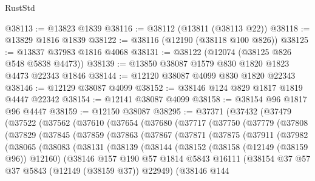 \begin{lexlean}{RustStd}
\begin{coremodule}
@38113 := @13823 @1839
@38116 := @38112 (@13811 (@38113 @22))
@38118 := @13829 @1816 @1839
@38122 := @38116 (@12190 (@38118 @100 @826))
@38125 := @13837 @37983 @1816 @4068
@38131 := @38122 (@12074 (@38125 @826 @548 @5838 @4473))
@38139 := @13850 @38087 @1579 @830 @1820 @1823 @4473 @22343 @1846
@38144 := @12120 @38087 @4099 @830 @1820 @22343
@38146 := @12129 @38087 @4099
@38152 := @38146 @124 @829 @1817 @1819 @4447 @22342
@38154 := @12141 @38087 @4099
@38158 := @38154 @96 @1817 @96 @4447
@38159 := @12150 @38087
@38295 := @37371
    (@37432
      (@37479
        (@37522
          (@37562
            (@37610
              (@37654
                (@37680
                  (@37717
                    (@37750
                      (@37779
                        (@37808
                          (@37829
                            (@37845
                              (@37859
                                (@37863
                                  (@37867
                                    (@37871
                                      (@37875
                                        (@37911
                                          (@37982
                                            (@38065
                                              (@38083
                                                (@38131
                                                  (@38139
                                                    (@38144
                                                      (@38152
                                                        (@38158 (@12149 (@38159 @96)) @12160)
                                                        (@38146
                                                          @157
                                                          @190
                                                          @57
                                                          @1814
                                                          @5843
                                                          @16111
                                                          (@38154
                                                            @37
                                                            @57
                                                            @37
                                                            @5843
                                                            (@12149 (@38159 @37))
                                                            @22949)
                                                          (@38146
                                                            @144

\end{coremodule}
\end{lexlean}
